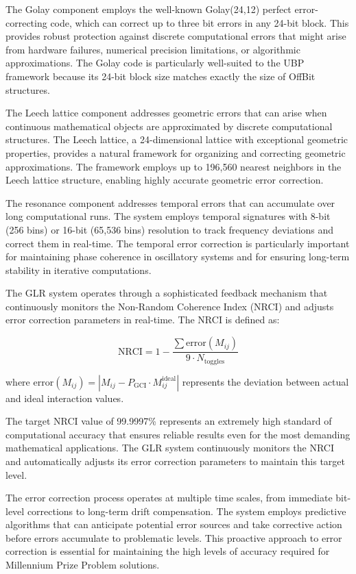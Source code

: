 \documentclass[11pt]{amsart}
\begin{document}
The Golay component employs the well-known Golay(24,12) perfect error-correcting code, which can correct up to three bit errors in any 24-bit block. This provides robust protection against discrete computational errors that might arise from hardware failures, numerical precision limitations, or algorithmic approximations. The Golay code is particularly well-suited to the UBP framework because its 24-bit block size matches exactly the size of OffBit structures.

The Leech lattice component addresses geometric errors that can arise when continuous mathematical objects are approximated by discrete computational structures. The Leech lattice, a 24-dimensional lattice with exceptional geometric properties, provides a natural framework for organizing and correcting geometric approximations. The framework employs up to 196,560 nearest neighbors in the Leech lattice structure, enabling highly accurate geometric error correction.

The resonance component addresses temporal errors that can accumulate over long computational runs. The system employs temporal signatures with 8-bit (256 bins) or 16-bit (65,536 bins) resolution to track frequency deviations and correct them in real-time. The temporal error correction is particularly important for maintaining phase coherence in oscillatory systems and for ensuring long-term stability in iterative computations.

The GLR system operates through a sophisticated feedback mechanism that continuously monitors the Non-Random Coherence Index (NRCI) and adjusts error correction parameters in real-time. The NRCI is defined as:

$$\text{NRCI} = 1 - \frac{\sum \text{error}(M_{ij})}{9 \cdot N_{\text{toggles}}}$$

where $\text{error}(M_{ij}) = |M_{ij} - P_{\text{GCI}} \cdot M_{ij}^{\text{ideal}}|$ represents the deviation between actual and ideal interaction values.

The target NRCI value of 99.9997\% represents an extremely high standard of computational accuracy that ensures reliable results even for the most demanding mathematical applications. The GLR system continuously monitors the NRCI and automatically adjusts its error correction parameters to maintain this target level.

The error correction process operates at multiple time scales, from immediate bit-level corrections to long-term drift compensation. The system employs predictive algorithms that can anticipate potential error sources and take corrective action before errors accumulate to problematic levels. This proactive approach to error correction is essential for maintaining the high levels of accuracy required for Millennium Prize Problem solutions.
\end{document}
